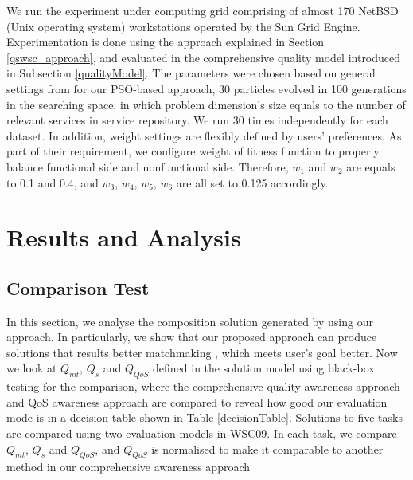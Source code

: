 \documentclass{llncs}
\begin{document}
We run the experiment under computing grid comprising of almost 170 NetBSD (Unix operating system) workstations operated by the Sun Grid Engine. Experimentation is done using the approach explained in Section \ref{qswsc_approach}, and evaluated in the comprehensive quality model introduced in Subsection \ref{qualityModel}. The parameters were chosen based on general settings from \cite{shi2001particle} for our PSO-based approach, 30 particles evolved in 100 generations in the searching space, in which problem dimension's size equals to the number of relevant services in service repository. We run 30 times independently for each dataset. In addition, weight settings are flexibly defined by users' preferences. As part of their requirement, we configure weight of fitness function to properly balance functional side and nonfunctional side. Therefore, $w_{1}$ and $w_{2}$ are equals to 0.1 and 0.4,  and $w_{3}$, $w_{4}$, $w_{5}$, $w_{6}$ are all set to 0.125 accordingly.

\section{Results and Analysis}\label{results_analysis}
\subsection{Comparison Test}\label{comparisonTest}

In this section, we analyse the composition solution generated by using our approach. In particularly, we show that our proposed approach can produce solutions that results better matchmaking , which meets user's goal better.
Now we look at $Q_{mt}$, $Q_{s}$ and $Q_{QoS}$ defined in the solution model using black-box testing for the comparison, where the comprehensive quality awareness approach and QoS awareness approach \cite{feng2013dynamic,huang2009effective,ma2015hybrid,da2014graph} are compared to reveal how good our evaluation mode is in a decision table shown in Table \ref{decisionTable}. Solutions to five tasks are compared using two evaluation models in WSC09. In each task, we compare $Q_{mt}$, $Q_{s}$ and $Q_{QoS}$, and $Q_{QoS}$ is normalised to make it comparable to another method in our comprehensive awareness approach 
\end{document}
